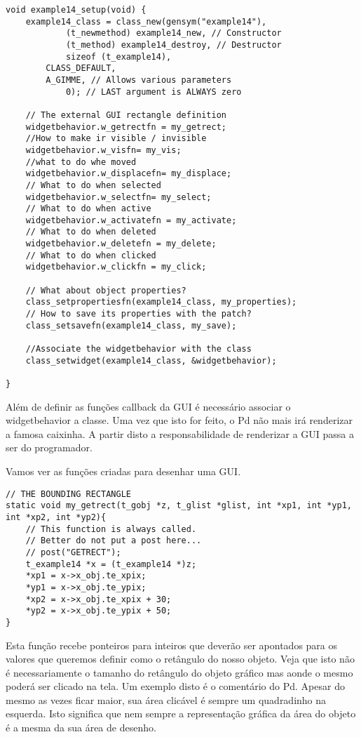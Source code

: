 \begin{lstlisting}
void example14_setup(void) {
    example14_class = class_new(gensym("example14"),
            (t_newmethod) example14_new, // Constructor
            (t_method) example14_destroy, // Destructor
            sizeof (t_example14),
	    CLASS_DEFAULT,
	    A_GIMME, // Allows various parameters
            0); // LAST argument is ALWAYS zero

    // The external GUI rectangle definition
    widgetbehavior.w_getrectfn = my_getrect;
    //How to make ir visible / invisible
    widgetbehavior.w_visfn= my_vis;
    //what to do whe moved
    widgetbehavior.w_displacefn= my_displace;
    // What to do when selected
    widgetbehavior.w_selectfn= my_select;
    // What to do when active
    widgetbehavior.w_activatefn = my_activate;
    // What to do when deleted
    widgetbehavior.w_deletefn = my_delete;
    // What to do when clicked
    widgetbehavior.w_clickfn = my_click;

    // What about object properties?
    class_setpropertiesfn(example14_class, my_properties);
    // How to save its properties with the patch?
    class_setsavefn(example14_class, my_save);

    //Associate the widgetbehavior with the class
    class_setwidget(example14_class, &widgetbehavior);

}
\end{lstlisting}

Além de definir as funções callback da GUI é necessário associar o widgetbehavior a classe. Uma vez que isto
for feito, o Pd não mais irá renderizar a famosa caixinha. A partir disto a responsabilidade de renderizar a 
GUI passa a ser do programador.

Vamos ver as funções criadas para desenhar uma GUI.

\begin{lstlisting}
// THE BOUNDING RECTANGLE
static void my_getrect(t_gobj *z, t_glist *glist, int *xp1, int *yp1, int *xp2, int *yp2){
	// This function is always called. 
	// Better do not put a post here...
	// post("GETRECT");
	t_example14 *x = (t_example14 *)z;
 	*xp1 = x->x_obj.te_xpix;
 	*yp1 = x->x_obj.te_ypix;
 	*xp2 = x->x_obj.te_xpix + 30;
 	*yp2 = x->x_obj.te_ypix + 50;
}
\end{lstlisting}

Esta função recebe ponteiros para inteiros que deverão ser apontados para os valores que queremos definir como
o retângulo do nosso objeto. Veja que isto não é necessariamente o tamanho do retângulo do objeto gráfico mas aonde o mesmo
poderá ser clicado na tela. Um exemplo disto é o comentário do Pd. Apesar do mesmo as vezes ficar maior, sua área 
clicável é sempre um quadradinho na esquerda. Isto significa que nem sempre a representação gráfica da área do objeto
é a mesma da sua área de desenho.

